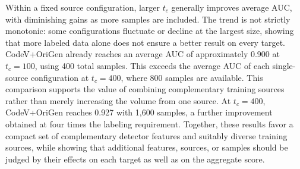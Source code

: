 Within a fixed source configuration, larger \(t_c\) generally improves average AUC, with diminishing gains as more samples are included. The trend is not strictly monotonic: some configurations fluctuate or decline at the largest size, showing that more labeled data alone does not ensure a better result on every target. CodeV+OriGen already reaches an average AUC of approximately 0.900 at \(t_c=100\), using 400 total samples. This exceeds the average AUC of each single-source configuration at \(t_c=400\), where 800 samples are available. This comparison supports the value of combining complementary training sources rather than merely increasing the volume from one source. At \(t_c=400\), CodeV+OriGen reaches 0.927 with 1,600 samples, a further improvement obtained at four times the labeling requirement. Together, these results favor a compact set of complementary detector features and suitably diverse training sources, while showing that additional features, sources, or samples should be judged by their effects on each target as well as on the aggregate score.

